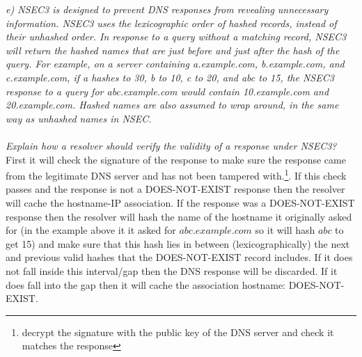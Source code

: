 \noindent \textit{e) NSEC3 is designed to prevent DNS responses from revealing unnecessary information. NSEC3 uses the lexicographic order of hashed records, instead of their unhashed order. In response to a query without a matching record, NSEC3 will return the hashed names that are just before and just after the hash of the query. For example, on a server containing a.example.com, b.example.com, and c.example.com, if a hashes to 30, b to 10, c to 20, and abc to 15, the NSEC3 response to a query for abc.example.com would contain 10.example.com and 20.example.com. Hashed names are also assumed to wrap around, in the same way as unhashed names in NSEC.\\\\
Explain how a resolver should verify the validity of a response under NSEC3?}\\

First it will check the signature of the response to make sure the response came from the legitimate DNS server and has not been tampered with.\footnote{decrypt the signature with the public key of the DNS server and check it matches the response}. If this check passes and the response is not a DOES-NOT-EXIST response then the resolver will cache the hostname-IP association. If the response was a DOES-NOT-EXIST response then the resolver will hash the name of the hostname it originally asked for (in the example above it it asked for $abc.example.com$ so it will hash $abc$ to get 15) and make sure that this hash lies in between (lexicographically) the next and previous valid hashes that the DOES-NOT-EXIST record includes. If it does not fall inside this interval/gap then the DNS response will be discarded. If it does fall into the gap then it will cache the association hostname: DOES-NOT-EXIST.

